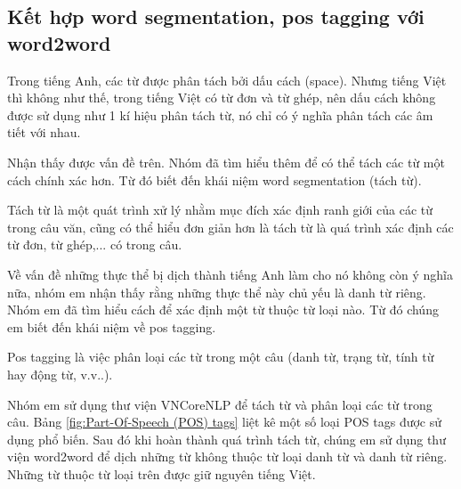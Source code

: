 \subsection{Kết hợp word segmentation, pos tagging với word2word}

Trong tiếng Anh, các từ được phân tách bởi dấu cách (space). Nhưng tiếng Việt thì không như thế, trong tiếng Việt có từ đơn và từ ghép, nên dấu cách không được sử dụng như 1 kí hiệu phân tách từ, nó chỉ có ý nghĩa phân tách các âm tiết với nhau. 

Nhận thấy được vấn đề trên. Nhóm đã tìm hiểu thêm để có thể tách các từ một cách chính xác hơn. Từ đó biết đến khái niệm word segmentation (tách từ). 

Tách từ là một quát trình xử lý nhằm mục đích xác định ranh giới của các từ trong câu văn, cũng có thể hiểu đơn giản hơn là tách từ là quá trình xác định các từ đơn, từ ghép,... có trong câu.

Về vấn đề những thực thể bị dịch thành tiếng Anh làm cho nó không còn ý nghĩa nữa, nhóm em nhận thấy rằng những thực thể này chủ yếu là danh từ riêng. Nhóm em đã tìm hiểu  cách để xác định một từ thuộc từ loại nào. Từ đó chúng em biết đến khái niệm về pos tagging.

Pos tagging là việc phân loại các từ trong một câu (danh từ, trạng từ, tính từ hay động từ, v.v..).

Nhóm em sử dụng thư viện VNCoreNLP để tách từ và phân loại các từ trong câu. Bảng \ref{fig:Part-Of-Speech (POS) tags} liệt kê một số loại POS tags được sử dụng phổ biến. Sau đó khi hoàn thành quá trình tách từ, chúng em sử dụng thư viện word2word để dịch những từ không thuộc từ loại danh từ và danh từ riêng. Những từ thuộc từ loại trên được giữ nguyên tiếng Việt.


